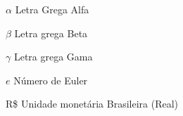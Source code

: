 \documentclass[
  12pt,		%
  a4paper,	%
  openright,%
  oneside,	%
  chapter=TITLE,		%
  section=TITLE,		%
  english,	%
  french,	%
  spanish,	%
  brazil
]{abntex2}
\begin{document}
    
    \begin{simbolos}
        \item[$\alpha$] Letra Grega Alfa
        \item[$\beta$] Letra grega Beta
        \item[$\gamma$] Letra grega Gama
        \item[$e$] Número de Euler
        \item[R\$] Unidade monetária Brasileira (Real)
    \end{simbolos}
    
    
    \tableofcontents*
    \newpage
    
    
    \textual
    \pagestyle{simple} 
    
    
\end{document}
